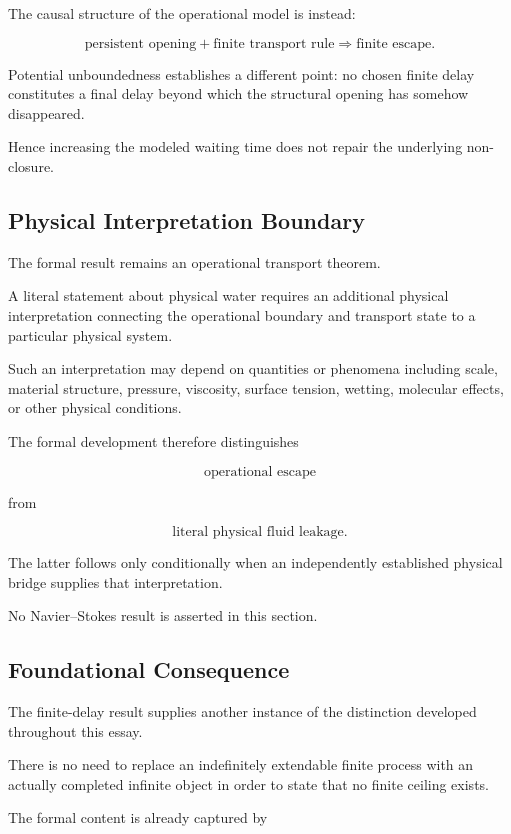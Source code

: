 \documentclass[11pt,a4paper]{article}
\begin{document}
The causal structure of the operational model is instead:

\[
\boxed{
\text{persistent opening}
+
\text{finite transport rule}
\Longrightarrow
\text{finite escape}.
}
\]

Potential unboundedness establishes a different point: no chosen
finite delay constitutes a final delay beyond which the structural
opening has somehow disappeared.

Hence increasing the modeled waiting time does not repair the
underlying non-closure.

\subsection{Physical Interpretation Boundary}

The formal result remains an operational transport theorem.

A literal statement about physical water requires an additional
physical interpretation connecting the operational boundary and
transport state to a particular physical system.

Such an interpretation may depend on quantities or phenomena including
scale, material structure, pressure, viscosity, surface tension,
wetting, molecular effects, or other physical conditions.

The formal development therefore distinguishes

\[
\boxed{
\text{operational escape}
}
\]

from

\[
\boxed{
\text{literal physical fluid leakage}.
}
\]

The latter follows only conditionally when an independently established
physical bridge supplies that interpretation.

No Navier--Stokes result is asserted in this section.

\subsection{Foundational Consequence}

The finite-delay result supplies another instance of the distinction
developed throughout this essay.

There is no need to replace an indefinitely extendable finite process
with an actually completed infinite object in order to state that no
finite ceiling exists.

The formal content is already captured by
\end{document}
